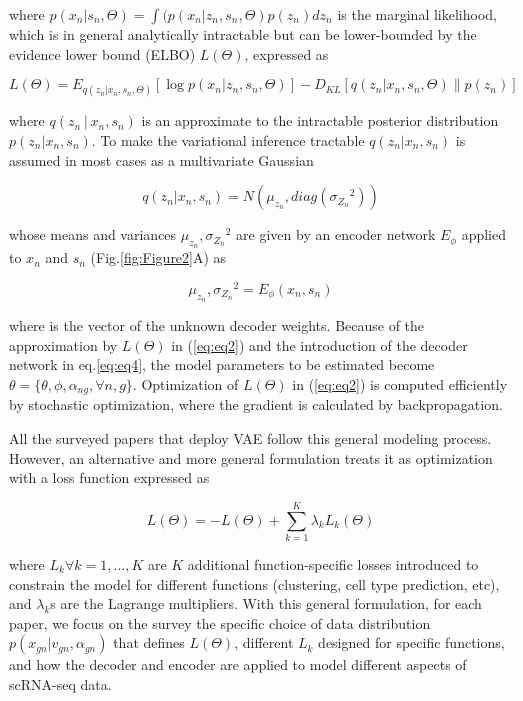 \documentclass[
]{book}
\begin{document}
where \(p(x_{n}\vert s_{n},\Theta)=\int(p(x_{n} \vert z_{n}, s_{n}, \Theta)p(z_{n})\textit{d}z_{n}\) is the marginal likelihood, which is in general analytically intractable but can be lower-bounded by the evidence lower bound (ELBO) \(\textit{L}(\Theta)\), expressed as

\begin{equation}
  \textit{L}(\Theta) = E_{q(z_{n} \vert x_{n},s_{n}, \Theta)}[\log{p(x_{n}\vert z_{n},s_{n}, \Theta)}] - D_{KL}[q(z_{n}\vert x_{n},s_{n},\Theta)\|p(z_{n})] \label{eq:eq3}
\end{equation}

where \(q(z_{n}│x_{n},s_{n})\) is an approximate to the intractable posterior distribution \(p(z_{n}\vert x_{n},s_{n})\). To make the variational inference tractable \(q(z_{n}\vert x_{n},s_{n})\) is assumed in most cases as a multivariate Gaussian

\begin{equation}
  q(z_{n} \vert x_{n},s_{n})= N(\mu_{z_{n}},diag({\sigma_{Z_{n}}}^2)) \label{eq:eq4}
\end{equation}

whose means and variances \({\mu_{z_{n}},{\sigma_{Z_{n}}}^2}\) are given by an encoder network \(E_{\phi}\) applied to \(x_{n}\) and \(s_{n}\) (Fig.\ref{fig:Figure2}A) as

\begin{equation}
   {\mu_{z_{n}},{\sigma_{Z_{n}}}^2} = E_{\phi}(x_{n},s_{n}) \label{eq:eq5}
\end{equation}

where \pi is the vector of the unknown decoder weights. Because of the approximation by \(\textit{L}(\Theta)\) in (\eqref{eq:eq2}) and the introduction of the decoder network in eq.\eqref{eq:eq4}, the model parameters to be estimated become \(\theta=\{ \theta,\phi, \alpha_{ng}, \forall{n}, g \}\). Optimization of \(\textit{L}(\Theta)\) in (\eqref{eq:eq2}) is computed efficiently by stochastic optimization, where the gradient is calculated by backpropagation.

All the surveyed papers that deploy VAE follow this general modeling process. However, an alternative and more general formulation treats it as optimization with a loss function expressed as

\begin{equation}
L(\Theta) = - L(\Theta) + \sum_{k=1}^{K}\lambda_{k}L_{k}(\Theta)\label{eq:eq6}
\end{equation}

where \(L_{k}\forall{k}=1,…,K\) are \(K\) additional function-specific losses introduced to constrain the model for different functions (clustering, cell type prediction, etc), and \(\lambda_{k}\)s are the Lagrange multipliers. With this general formulation, for each paper, we focus on the survey the specific choice of data distribution \(p(x_{gn} \vert v_{gn},\alpha_{gn})\) that defines \(L(\Theta)\), different \(L_{k}\) designed for specific functions, and how the decoder and encoder are applied to model different aspects of scRNA-seq data.
\end{document}
